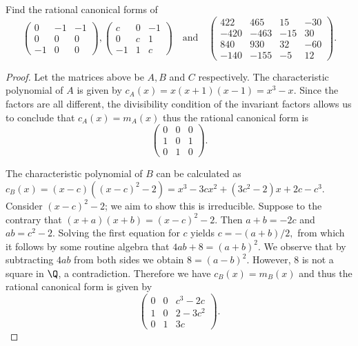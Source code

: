 \documentclass[10pt]{amsart}
\begin{document}
\begin{thm}
  \label{Ex4}
  Find the rational canonical forms of
  $$
  \begin{pmatrix}
    0 & -1 & -1\\
    0 & 0 & 0 \\
    -1 & 0 & 0
  \end{pmatrix},
  \begin{pmatrix}
    c & 0 &-1\\
    0 & c & 1\\
    -1 & 1 & c
  \end{pmatrix}
  \quad
  \text{and}
  \quad
  \begin{pmatrix}
    422 & 465 & 15 & -30\\
    -420 & -463 & -15 & 30\\
    840 & 930 & 32 & -60\\
    -140 & -155 & -5 & 12
  \end{pmatrix}.
  $$
  \begin{proof}
    Let the matrices above be $A, B$ and $C$ respectively.
    The characteristic polynomial of $A$ is given by $c_A(x) = x(x+1)(x-1) = x^3 - x$.
    Since the factors are all different, the divisibility condition of the invariant factors allows us to conclude that $c_A(x) = m_A(x)$ thus the rational canonical form is 
    $$
    \begin{pmatrix}
      0 & 0 & 0\\
      1 & 0 & 1\\
      0 & 1 & 0
    \end{pmatrix}.
    $$
    
    The characteristic polynomial of $B$ can be calculated as $c_B(x) = (x-c)((x-c)^2 - 2) = x^3 - 3cx^2 + (3c^2-2)x + 2c - c^3$.
    Consider $(x-c)^2 - 2$; we aim to show this is irreducible.
    Suppose to the contrary that $(x+a)(x+b) = (x-c)^2 - 2$.
    Then $a+b = -2c$ and $ab = c^2 - 2$.
    Solving the first equation for $c$ yields $c = -(a+b)/2,$ from which it follows by some routine algebra that $4ab + 8 = (a+b)^2$.
    We observe that by subtracting $4ab$ from both sides we obtain $8 = (a-b)^2$.
    However, $8$ is not a square in $\Q$, a contradiction.
    Therefore we have $c_B(x) = m_B(x)$ and thus the rational canonical form is given by 
    $$
    \begin{pmatrix}
      0 & 0 & c^3 - 2c\\
      1 & 0 & 2 - 3c^2\\
      0 & 1 & 3c
    \end{pmatrix}.
    $$
    

\end{proof}
\end{thm}
\end{document}
